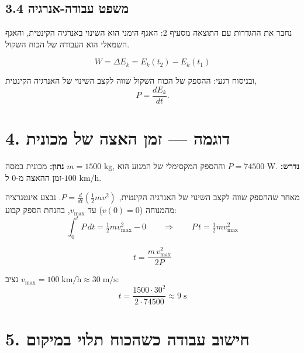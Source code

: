 \documentclass[12pt, a4paper]{article}
\begin{document}
\subsection*{3.4 משפט עבודה-אנרגיה}

נחבר את ההגדרות עם התוצאה מסעיף 2: האגף הימני הוא השינוי באנרגיה הקינטית, והאגף השמאלי הוא העבודה של הכוח השקול.

\begin{tcolorbox}[resultbox, title={משפט עבודה-אנרגיה}]
\[
  W = \Delta E_k = E_k(t_2) - E_k(t_1)
\]
\end{tcolorbox}

\begin{tcolorbox}[notebox]
ובניסוח רגעי: ההספק של הכוח השקול שווה לקצב השינוי של האנרגיה הקינטית,
\[
  P = \frac{dE_k}{dt}.
\]
\end{tcolorbox}

\section*{4. דוגמה --- זמן האצה של מכונית}

\textbf{נתון:} מכונית במסה \textenglish{$m = 1500$ kg}, וההספק המקסימלי של המנוע הוא \textenglish{$P = 74500$ W}. \textbf{נדרש:} זמן ההאצה מ-\textenglish{$0$} ל-\textenglish{$100$ km/h}.

מאחר שההספק שווה לקצב השינוי של האנרגיה הקינטית, \textenglish{$P = \tfrac{d}{dt}\!\left(\tfrac12 m v^2\right)$}. נבצע אינטגרציה מהמנוחה (\textenglish{$v(0)=0$}) עד \textenglish{$v_{\max}$}, בהנחת הספק קבוע:
\[
  \int_0^{t} P\,dt = \tfrac{1}{2}m v_{\max}^2 - 0
  \qquad\Longrightarrow\qquad
  P\,t = \tfrac{1}{2}m v_{\max}^2
\]

\begin{tcolorbox}[resultbox]
\[
  t = \frac{m\,v_{\max}^2}{2P}
\]
\end{tcolorbox}

נציב \textenglish{$v_{\max} = 100\;\text{km/h} \approx 30\;\text{m/s}$}:
\[
  t = \frac{1500 \cdot 30^2}{2 \cdot 74500} \approx 9\;\text{s}
\]

\section*{5. חישוב עבודה כשהכוח תלוי במיקום}
\end{document}
